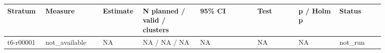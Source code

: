 \begingroup
\small
\setlength{\tabcolsep}{2pt}
\begin{longtable}{@{}p{0.09\linewidth}p{0.14\linewidth}p{0.08\linewidth}p{0.14\linewidth}p{0.14\linewidth}p{0.1\linewidth}p{0.1\linewidth}p{0.11\linewidth}@{}}
\hline
Stratum & Measure & Estimate & N planned / valid / clusters & 95\% CI & Test & p / Holm p & Status \\
\hline
t6-r00001 & not\_\allowbreak{}available & NA & NA / NA / NA & NA & NA & NA & not\_\allowbreak{}run \\
\hline
\end{longtable}
\endgroup
